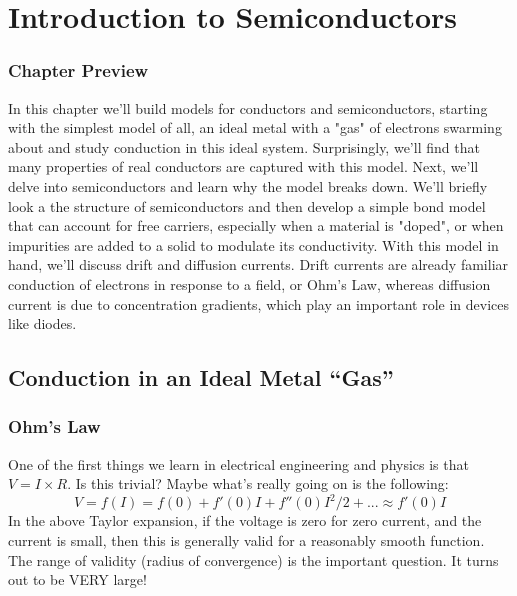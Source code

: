 \graphicspath{{./figs_semi/}}




\chapter{Introduction to Semiconductors}








\subsection{Chapter Preview}


In this chapter we'll build models for conductors and semiconductors, starting with the simplest model of all, an ideal metal with a "gas" of electrons swarming about and study conduction in this ideal system.  Surprisingly, we'll find that many properties of real conductors are captured with this model.  Next, we'll delve into semiconductors and learn why the model breaks down.  We'll briefly look a the structure of semiconductors and then develop a simple bond model that can account for free carriers, especially when a material is "doped", or when impurities are added to a solid to modulate its conductivity.  With this model in hand, we'll discuss drift and diffusion currents.  Drift currents are already familiar conduction of electrons in response to a field, or Ohm's Law, whereas diffusion current is due to concentration gradients, which play an important role in devices like diodes. 








\section{Conduction in an Ideal Metal ``Gas''}




\subsection{Ohm’s Law}


One of the first things we learn in electrical engineering and physics is that  $V = I \times R$.
Is this trivial? Maybe what’s really going on is the following:
\begin{equation}
        V = f(I) = f(0) + f'(0)I + f''(0){I^2}/2 + ... \approx f'(0)I
\end{equation}
In the above Taylor expansion, if the voltage is zero for zero current, and the current is small, then this is generally valid for a reasonably smooth function.   The range of validity (radius of convergence) is the important question. It turns out to be VERY large!
